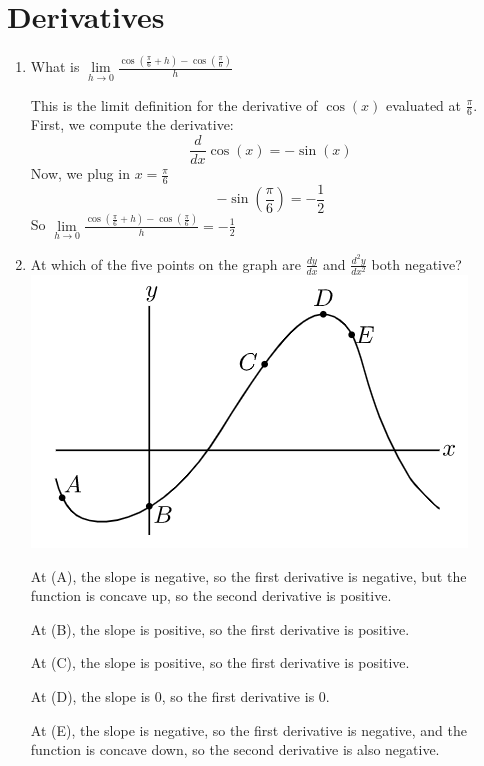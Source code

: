 \documentclass{article}
\begin{document}
\section{Derivatives}
\begin{enumerate}
\item What is $\underset{h \rightarrow 0}{\lim}
    \frac{\cos\left(\frac{\pi}{6} + h\right) - \cos\left(\frac{\pi}{6}\right)}{h}$
    
This is the limit definition for the derivative of $\cos(x)$ evaluated at $\frac{\pi}{6}$.
First, we compute the derivative:
\[\frac{d}{dx}\cos(x) = -\sin(x)\]
Now, we plug in $x = \frac{\pi}{6}$
\[-\sin\left(\frac{\pi}{6}\right) = -\frac{1}{2}\]
So $\underset{h \rightarrow 0}{\lim}
    \frac{\cos\left(\frac{\pi}{6} + h\right) - \cos\left(\frac{\pi}{6}\right)}{h} = -\frac{1}{2}$

\item At which of the five points on the graph are $\frac{dy}{dx}$ and $\frac{d^{2}y}{dx^{2}}$ both negative?
\\\includegraphics[scale = 0.95]{Images/Deriv1.png}

At (A), the slope is negative, so the first derivative is negative, but the function is concave up,
so the second derivative is positive.

At (B), the slope is positive, so the first derivative is positive.

At (C), the slope is positive, so the first derivative is positive.

At (D), the slope is 0, so the first derivative is 0.

At (E), the slope is negative, so the first derivative is negative, and the function is concave down,
so the second derivative is also negative.


\end{enumerate}
\end{document}
